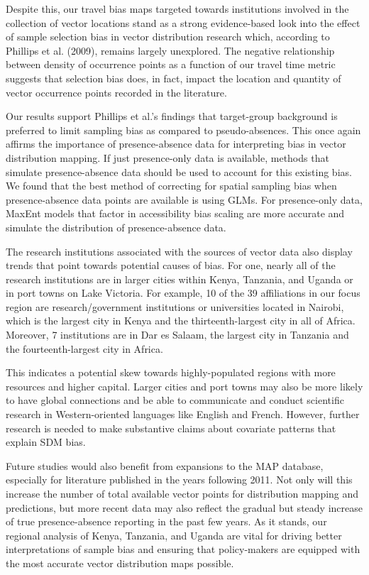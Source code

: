 \documentclass[sn-nature]{sn-jnl}%
\begin{document}
Despite this, our travel bias maps targeted towards institutions involved in the collection of vector locations stand as a strong evidence-based look into the effect of sample selection bias in vector distribution research which, according to Phillips et al. (2009), remains largely unexplored. The negative relationship between density of occurrence points as a function of our travel time metric suggests that selection bias does, in fact, impact the location and quantity of vector occurrence points recorded in the literature. 

Our results support Phillips et al.’s findings that target-group background is preferred to limit sampling bias as compared to pseudo-absences. This once again affirms the importance of presence-absence data for interpreting bias in vector distribution mapping. If just presence-only data is available, methods that simulate presence-absence data should be used to account for this existing bias. We found that the best method of correcting for spatial sampling bias when presence-absence data points are available is using GLMs. For presence-only data, MaxEnt models that factor in accessibility bias scaling are more accurate and simulate the distribution of presence-absence data. 

The research institutions associated with the sources of vector data also display trends that point towards potential causes of bias. For one, nearly all of the research institutions are in larger cities within Kenya, Tanzania, and Uganda or in port towns on Lake Victoria. For example, 10 of the 39 affiliations in our focus region are research/government institutions or universities located in Nairobi, which is the largest city in Kenya and the thirteenth-largest city in all of Africa. Moreover, 7 institutions are in Dar es Salaam, the largest city in Tanzania and the fourteenth-largest city in Africa. 

This indicates a potential skew towards highly-populated regions with more resources and higher capital. Larger cities and port towns may also be more likely to have global connections and be able to communicate and conduct scientific research in Western-oriented languages like English and French. However, further research is needed to make substantive claims about covariate patterns that explain SDM bias. 

Future studies would also benefit from expansions to the MAP database, especially for literature published in the years following 2011. Not only will this increase the number of total available vector points for distribution mapping and predictions, but more recent data may also reflect the gradual but steady increase of true presence-absence reporting in the past few years. As it stands, our regional analysis of Kenya, Tanzania, and Uganda are vital for driving better interpretations of sample bias and ensuring that policy-makers are equipped with the most accurate vector distribution maps possible.
\end{document}
